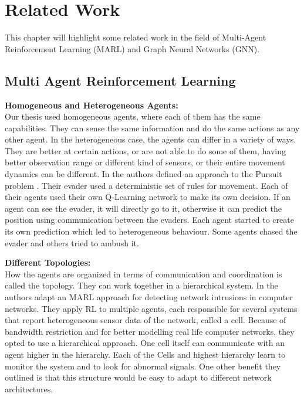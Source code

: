 
\chapter{Related Work}
\label{ch:Related Work}

This chapter will highlight some related work in the field of Multi-Agent Reinforcement Learning (MARL) and Graph Neural Networks (GNN).



\section{Multi Agent Reinforcement Learning}
\textbf{Homogeneous and Heterogeneous Agents:}\\
Our thesis used homogeneous agents, where each of them has the same capabilities. They can sense the same information and do the same actions as any other agent. In the heterogeneous case, the agents can differ in a variety of ways. They are better at certain actions, or are not able to do some of them, having better observation range or different kind of sensors, or their entire movement dynamics can be different. In \citet{ISHIWAKA2003245} the authors defined an approach to the Pursuit problem . Their evader used a deterministic set of rules for movement. Each of their agents used their own Q-Learning network to make its own decision. If an agent can see the evader, it will directly go to it, otherwise it can predict the position using communication between the evaders. Each agent started to create its own prediction which led to heterogeneous behaviour. Some agents chased the evader and others tried to ambush it.\par

\textbf{Different Topologies:} \\
How the agents are organized in terms of communication and coordination is called the topology. They can work together in a hierarchical system. In \citet{Intrusion2008} the authors adapt an MARL approach for detecting network intrusions in computer networks. They apply RL to multiple agents, each responsible for several systems that report heterogeneous sensor data of the network, called a cell. Because of bandwidth restriction and for better modelling real life computer networks, they opted to use a hierarchical approach. One cell itself can communicate with an agent higher in the hierarchy. Each of the Cells and highest hierarchy learn to monitor the system and to look for abnormal signals. One other benefit they outlined is that this structure would be easy to adapt to different network architectures. \par

